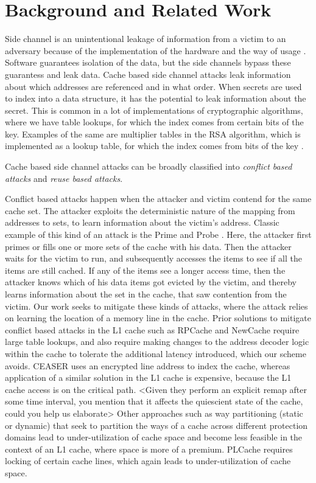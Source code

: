 \section{Background and Related Work}
Side channel is an unintentional leakage of information from a victim to an adversary because of the implementation of the hardware and the way of usage \cite{szefer2019survey}. Software guarantees isolation of the data, but the side channels bypass these guarantess and leak data. Cache based side channel attacks leak information about which addresses are referenced and in what order. When secrets are used to index into a data structure, it has the potential to leak information about the secret. This is common in a lot of implementations of cryptographic algorithms, where we have table lookups, for which the index comes from certain bits of the key. Examples of the same are multiplier tables in the RSA algorithm, which is implemented as a lookup table, for which the index comes from bits of the key \cite{liu2014random}.

Cache based side channel attacks can be broadly classified into \textit{conflict based attacks} \cite{deng2019analysis} and \textit{reuse based attacks}.

Conflict based attacks happen when the attacker and victim contend for the same cache set. The attacker exploits the deterministic nature of the mapping from addresses to sets, to learn information about the victim's address. Classic example of this kind of an attack is the Prime and Probe \cite{percival2005cache} \cite{osvik2006cache}. Here, the attacker first primes or fills one or more sets of the cache with his data. Then the attacker waits for the victim to run, and subsequently accesses the items to see if all the items are still cached. If any of the items see a longer access time, then the attacker knows which of his data items got evicted by the victim, and thereby learns information about the set in the cache, that saw contention from the victim. Our work seeks to mitigate these kinds of attacks, where the attack relies on learning the location of a memory line in the cache. 
Prior solutions to mitigate conflict based attacks in the L1 cache such as RPCache \cite{wang2007new} and NewCache \cite{wang2008novel} require large table lookups, and also require making changes to the address decoder logic within the cache to tolerate the additional latency introduced, which our scheme avoids. CEASER \cite{qureshi2018ceaser} uses an encrypted line address to index the cache, whereas application of a similar solution in the L1 cache is expensive, because the L1 cache access is on the critical path. <Given they perform an explicit remap after some time interval, you mention that it affects the quiescient state of the cache, could you help us elaborate> Other approaches such as way partitioning (static or dynamic) that seek to partition the ways of a cache across different protection domains \cite{wang2016secdcp} \cite{liu2016catalyst} \cite{domnitser2012non} \cite{kiriansky2018dawg} lead to under-utilization of cache space and become less feasible in the context of an L1 cache, where space is more of a premium. PLCache \cite{wang2007new} requires locking of certain cache lines, which again leads to under-utilization of cache space.

